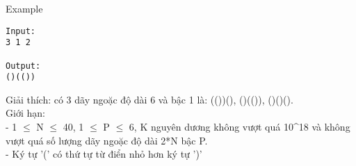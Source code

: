 Example
\begin{verbatim}
Input:
3 1 2

Output:
()(())
\end{verbatim}

   Giải thích: có 3 dãy ngoặc độ dài 6 và bậc 1 là: (())(), ()(()), ()()().   
\\   Giới hạn:   
\\   - 1  $\le$  N  $\le$  40, 1  $\le$  P  $\le$  6, K nguyên dương không vượt quá 10^18 và không vượt quá số lượng dãy ngoặc độ dài 2*N bậc P.   
\\   - Ký tự '(' có thứ tự từ điển nhỏ hơn ký tự ')'
